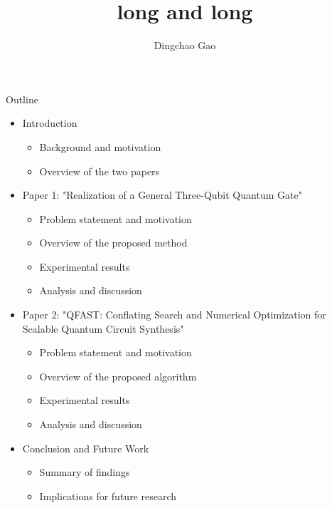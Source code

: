 \documentclass[aspectratio=1610]{beamer}
\title[]{long and long}
\author[Gcc]{Dingchao Gao}
\institute[ISCAS]{Institute of Software Chinese Academy of Sciences}
\begin{document}
\begin{frame}{Outline}
  \begin{itemize}
      \item Introduction
      \begin{itemize}
          \item Background and motivation
          \item Overview of the two papers
      \end{itemize}
      \item Paper 1: "Realization of a General Three-Qubit Quantum Gate"
      \begin{itemize}
          \item Problem statement and motivation
          \item Overview of the proposed method
          \item Experimental results
          \item Analysis and discussion
      \end{itemize}
      \item Paper 2: "QFAST: Conflating Search and Numerical Optimization for Scalable Quantum Circuit Synthesis"
      \begin{itemize}
          \item Problem statement and motivation
          \item Overview of the proposed algorithm
          \item Experimental results
          \item Analysis and discussion
      \end{itemize}
      \item Conclusion and Future Work
      \begin{itemize}
          \item Summary of findings
          \item Implications for future research
      \end{itemize}
  \end{itemize}
\end{frame}
\end{document}
